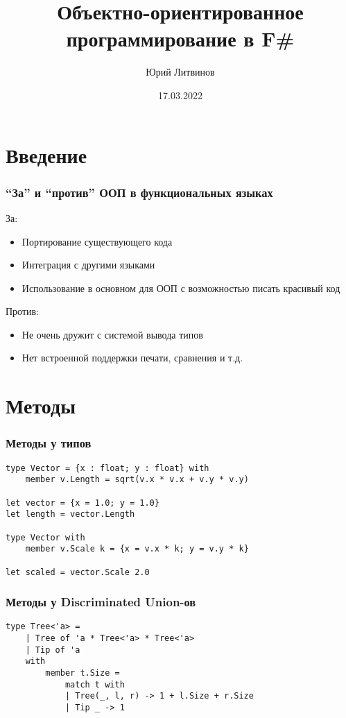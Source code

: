 \documentclass[xetex,mathserif,serif]{beamer}
\title{Объектно-ориентированное программирование в F\#}
\author{Юрий Литвинов}
\date{17.03.2022}
\begin{document}
    
    \frame{\titlepage}
    
    \section{Введение}

    \begin{frame}
        \frametitle{``За'' и ``против'' ООП в функциональных языках}
        За:
        \begin{itemize}
            \item Портирование существующего кода
            \item Интеграция с другими языками
            \item Использование в основном для ООП с возможностью писать красивый код
        \end{itemize}
        
        Против:
        \begin{itemize}
            \item Не очень дружит с системой вывода типов
            \item Нет встроенной поддержки печати, сравнения и т.д.
        \end{itemize}
    \end{frame}
    
    \section{Методы}
    
    \begin{frame}[fragile]
        \frametitle{Методы у типов}
        \begin{verbatim}
type Vector = {x : float; y : float} with
    member v.Length = sqrt(v.x * v.x + v.y * v.y)

let vector = {x = 1.0; y = 1.0}
let length = vector.Length

type Vector with
    member v.Scale k = {x = v.x * k; y = v.y * k}

let scaled = vector.Scale 2.0
        \end{verbatim}
    \end{frame}

    \begin{frame}[fragile]
        \frametitle{Методы у Discriminated Union-ов}
        \begin{verbatim}
type Tree<'a> =
    | Tree of 'a * Tree<'a> * Tree<'a>
    | Tip of 'a
    with
        member t.Size = 
            match t with
            | Tree(_, l, r) -> 1 + l.Size + r.Size
            | Tip _ -> 1
        \end{verbatim}
    \end{frame}
\end{document}
